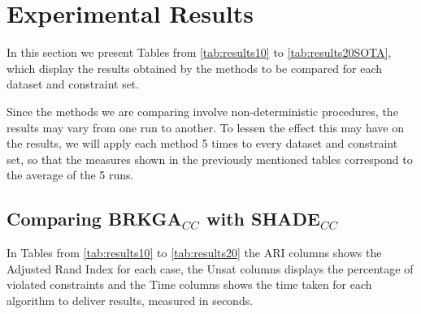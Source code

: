 \documentclass[review]{elsarticle}
\begin{document}
\section{Experimental Results} \label{sec:results}

In this section we present Tables from \ref{tab:results10} to \ref{tab:results20SOTA}, which display the results obtained by the methods to be compared for each dataset and constraint set.

Since the methods we are comparing involve non-deterministic procedures, the results may vary from one run to another. To lessen the effect this may have on the results, we will apply each method 5 times to every dataset and constraint set, so that the measures shown in the previously mentioned tables correspond to the average of the 5 runs.

\subsection{Comparing BRKGA$_{CC}$ with SHADE$_{CC}$}

In Tables from \ref{tab:results10} to \ref{tab:results20} the ARI columns shows the Adjusted Rand Index for each case, the Unsat columns displays the percentage of violated constraints and the Time columns shows the time taken for each algorithm to deliver results, measured in seconds.
\end{document}

